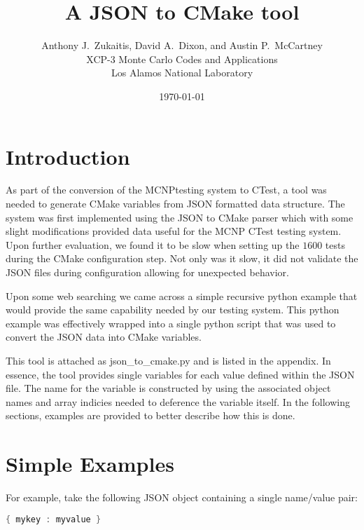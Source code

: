 \documentclass[12pt]{article}
\title{A JSON to CMake tool}
\author{ Anthony J.\ Zukaitis, David A.\ Dixon, and Austin P.\ McCartney \\
         XCP-3 Monte Carlo Codes and Applications \\
	 Los Alamos National Laboratory }
\date{\today}
\begin{document}
\maketitle

\section{Introduction}

As part of the conversion of the MCNP\textregistered testing system to CTest\cite{mcnpctest}, a tool was needed to generate CMake variables
from JSON formatted data structure.  The system was first implemented using the JSON to CMake parser \cite{jsoncmake} which with some slight modifications provided data useful for the MCNP CTest testing system.  Upon further evaluation, we found it to be slow when setting up the $1600$ tests during the CMake configuration step.  Not only was it slow, it did not validate the JSON files during configuration allowing for unexpected behavior.   

Upon some web searching we came across a simple recursive python example that would provide the same capability needed by our testing system\cite{flatten}.  This python example was effectively wrapped into a single python script that was used to convert the JSON data into CMake variables.

This tool is attached as json\_to\_cmake.py and is listed in the appendix.  In essence, the tool provides single variables for each value defined within the JSON file. The name for the variable is constructed by using the associated object names and array indicies needed to deference the variable itself.  In the following sections, examples are provided to better describe how this is done.

\section{Simple Examples}
For example, take the following JSON object containing a single name/value pair:
\begin{lstlisting}[language=java,basicstyle=\tiny,frame=single,columns=fullflexible]
{ mykey : myvalue }
\end{lstlisting}
\end{document}

